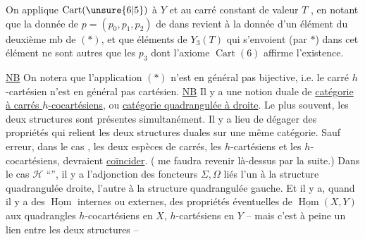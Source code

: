 On applique $\operatorname{Cart}(\unsure{6|5})$ à $Y$ et au carré constant  de valeur $T$
, en notant que la donnée de $p=(p_0,p_1,p_2)$ de
dans
revient à la donnée d'un élément du deuxième mb de $(*)$, et que 
éléments  de $Y_3(T)$ qui s'envoient (par $*$) dans cet élément ne sont autres que les $p_3$ dont l'axiome $\operatorname{Cart}(6)$ affirme l'existence.

\uline{NB} On notera que l'application  $(*)$ n'est en général pas bijective, i.e. le carré $h$-cartésien n'est en général pas cartésien.
\uline{NB} Il y a une notion duale de \uline{catégorie à carrés $h$-cocartésiens}, ou \uline{catégorie quadrangulée à droite}. Le plus souvent, les deux structures sont présentes simultanément. Il y a lieu de dégager des propriétés qui relient les deux structures duales sur une même catégorie.  Sauf erreur, dans le cas  , les deux espèces de carrés, les $h$-cartésiens et les $h$-cocartésiens, devraient \uline{coïncider}. ( me faudra revenir là-dessus par la suite.) Dans le cas $\mathscr H$ ``'', il y a l'adjonction des foncteurs $\Sigma,\Omega$ liés l'un à la structure quadrangulée droite, l'autre à la structure quadrangulée gauche. Et il y a, quand il y a des $\underline{\operatorname{Hom}}$ internes ou externes, des propriétés éventuelles de $\underline{\operatorname{Hom}}(X,Y)$  aux quadrangles $h$-cocartésiens en $X$, $h$-cartésiens en $Y$ -- mais c'est à peine un lien entre les deux structures --

